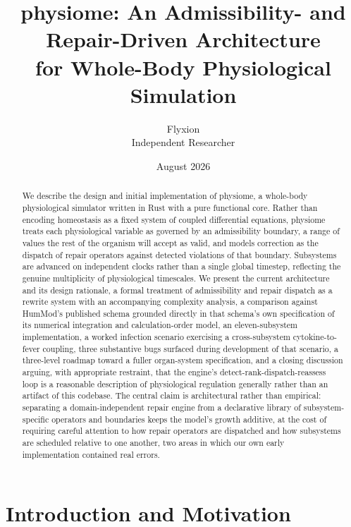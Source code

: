 \documentclass[11pt]{article}
\title{physiome: An Admissibility- and Repair-Driven Architecture\\
for Whole-Body Physiological Simulation}
\author{Flyxion \\ Independent Researcher}
\date{August 2026}
\begin{document}
\maketitle

\begin{abstract}
We describe the design and initial implementation of physiome, a whole-body physiological simulator written in Rust with a pure functional core. Rather than encoding homeostasis as a fixed system of coupled differential equations, physiome treats each physiological variable as governed by an admissibility boundary, a range of values the rest of the organism will accept as valid, and models correction as the dispatch of repair operators against detected violations of that boundary. Subsystems are advanced on independent clocks rather than a single global timestep, reflecting the genuine multiplicity of physiological timescales. We present the current architecture and its design rationale, a formal treatment of admissibility and repair dispatch as a rewrite system with an accompanying complexity analysis, a comparison against HumMod's published schema grounded directly in that schema's own specification of its numerical integration and calculation-order model, an eleven-subsystem implementation, a worked infection scenario exercising a cross-subsystem cytokine-to-fever coupling, three substantive bugs surfaced during development of that scenario, a three-level roadmap toward a fuller organ-system specification, and a closing discussion arguing, with appropriate restraint, that the engine's detect-rank-dispatch-reassess loop is a reasonable description of physiological regulation generally rather than an artifact of this codebase. The central claim is architectural rather than empirical: separating a domain-independent repair engine from a declarative library of subsystem-specific operators and boundaries keeps the model's growth additive, at the cost of requiring careful attention to how repair operators are dispatched and how subsystems are scheduled relative to one another, two areas in which our own early implementation contained real errors.
\end{abstract}

\section{Introduction and Motivation}
\label{sec:intro}
\end{document}
